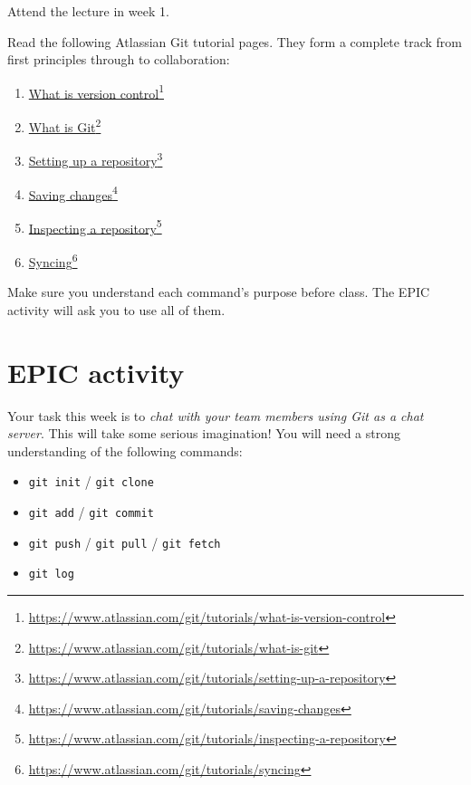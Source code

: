 \documentclass[twoside=false,DIV=14]{scrartcl}
\begin{document}
Attend the lecture in week 1.\par
Read the following Atlassian Git tutorial pages.  They form a complete track from first principles through to collaboration:
\begin{enumerate}
    \item \href{https://www.atlassian.com/git/tutorials/what-is-version-control}{What is version control}\footnote{\url{https://www.atlassian.com/git/tutorials/what-is-version-control}}
    \item \href{https://www.atlassian.com/git/tutorials/what-is-git}{What is Git}\footnote{\url{https://www.atlassian.com/git/tutorials/what-is-git}}
    \item \href{https://www.atlassian.com/git/tutorials/setting-up-a-repository}{Setting up a repository}\footnote{\url{https://www.atlassian.com/git/tutorials/setting-up-a-repository}}
    \item \href{https://www.atlassian.com/git/tutorials/saving-changes}{Saving changes}\footnote{\url{https://www.atlassian.com/git/tutorials/saving-changes}}
    \item \href{https://www.atlassian.com/git/tutorials/inspecting-a-repository}{Inspecting a repository}\footnote{\url{https://www.atlassian.com/git/tutorials/inspecting-a-repository}}
    \item \href{https://www.atlassian.com/git/tutorials/syncing}{Syncing}\footnote{\url{https://www.atlassian.com/git/tutorials/syncing}}
\end{enumerate}
Make sure you understand each command's purpose before class.  The EPIC activity will ask you to use all of them.


\section*{EPIC activity}

Your task this week is to \emph{chat with your team members using Git as a chat server}.  This will take some serious imagination!  You will need a strong understanding of the following commands:
\begin{itemize}
\itemsep0em
\item \texttt{git init} / \texttt{git clone}
\item \texttt{git add} / \texttt{git commit}
\item \texttt{git push} / \texttt{git pull} / \texttt{git fetch}
\item \texttt{git log}
\end{itemize}
\end{document}
